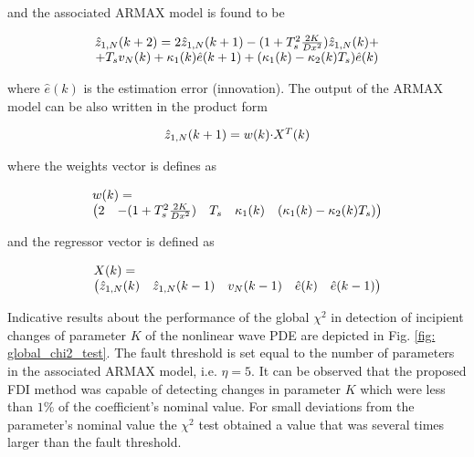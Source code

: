 \documentclass[journal]{IEEEtran}
\begin{document}
\noindent and the associated ARMAX model is found to be

\begin{equation}\label{ARMA_model_KF}
\begin{tabular}{c}
$\hat{z}_{1,N}(k+2)=2\hat{z}_{1,N}(k+1)-(1+{T_s^2}{{2K} \over {Dx^2}})\hat{z}_{1,N}(k)+$\\
$+{T_s}v_N(k)+{\kappa_1(k)}\hat{e}(k+1)+(\kappa_1(k)-{\kappa_2(k)}T_s)\hat{e}(k)$
\end{tabular}
\end{equation}

\noindent where $\hat{e}(k)$ is the estimation error (innovation). The output of the ARMAX model can be also written in the product form

\begin{equation}\label{ARMA_model_KF_v2}
\begin{tabular}{c}
$\hat{z}_{1,N}(k+1)=w(k){\cdot}X^T(k)$
\end{tabular}
\end{equation}

\noindent where the weights vector is defines as

\begin{equation}\label{weights_vector}
\begin{tabular}{l}
$w(k)=$\\
$\begin{pmatrix}
2 & -(1+{T_s^2}{{2K} \over {Dx^2}}) & {T_s} & {\kappa_1(k)} & (\kappa_1(k)-{\kappa_2(k)}T_s)
\end{pmatrix}$
\end{tabular}
\end{equation}

\noindent and the regressor vector is defined as

\begin{equation} \label{regressor_vector}
\begin{tabular}{l}
$X(k)=$\\
$\begin{pmatrix}
\hat{z}_{1,N}(k) &  \hat{z}_{1,N}(k-1) & v_N(k-1) & \hat{e}(k) & \hat{e}(k-1)
\end{pmatrix}$
\end{tabular}
\end{equation}

\noindent Indicative results about the performance of the global $\chi^2$ in detection of incipient changes of parameter $K$ of the nonlinear wave PDE are depicted in Fig. \ref{fig: global_chi2_test}. The fault threshold is set equal to the number of parameters in the associated ARMAX model, i.e. $\eta=5$. It can be observed that the proposed FDI method was capable of detecting changes in parameter $K$ which were less than $1\%$ of the coefficient's nominal value. For small deviations from the parameter's nominal value the $\chi^2$ test obtained a value that was several times larger than the fault threshold.
\end{document}
